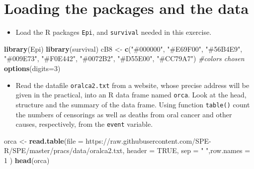 \documentclass[
]{book}
\newenvironment{Shaded}{\begin{snugshade}}{\end{snugshade}}
\newcommand{\AttributeTok}[1]{\textcolor[rgb]{0.13,0.29,0.53}{#1}}
\newcommand{\CommentTok}[1]{\textcolor[rgb]{0.56,0.35,0.01}{\textit{#1}}}
\newcommand{\ConstantTok}[1]{\textcolor[rgb]{0.56,0.35,0.01}{#1}}
\newcommand{\DecValTok}[1]{\textcolor[rgb]{0.00,0.00,0.81}{#1}}
\newcommand{\FunctionTok}[1]{\textcolor[rgb]{0.13,0.29,0.53}{\textbf{#1}}}
\newcommand{\NormalTok}[1]{#1}
\newcommand{\OtherTok}[1]{\textcolor[rgb]{0.56,0.35,0.01}{#1}}
\newcommand{\StringTok}[1]{\textcolor[rgb]{0.31,0.60,0.02}{#1}}
\providecommand{\tightlist}{%
  \setlength{\itemsep}{0pt}\setlength{\parskip}{0pt}}
\begin{document}
\section{Loading the packages and the data}\label{loading-the-packages-and-the-data}

\begin{itemize}
\tightlist
\item
  Load the R packages \texttt{Epi}, and \texttt{survival} needed in this exercise.
\end{itemize}

\begin{Shaded}
\begin{Highlighting}[]
\FunctionTok{library}\NormalTok{(Epi)}
\FunctionTok{library}\NormalTok{(survival)}
\NormalTok{cB8  }\OtherTok{\textless{}{-}} \FunctionTok{c}\NormalTok{(}\StringTok{"\#000000"}\NormalTok{, }\StringTok{"\#E69F00"}\NormalTok{, }\StringTok{"\#56B4E9"}\NormalTok{, }\StringTok{"\#009E73"}\NormalTok{, }
          \StringTok{"\#F0E442"}\NormalTok{, }\StringTok{"\#0072B2"}\NormalTok{, }\StringTok{"\#D55E00"}\NormalTok{, }\StringTok{"\#CC79A7"}\NormalTok{) }\CommentTok{\#colors chosen}
\FunctionTok{options}\NormalTok{(}\AttributeTok{digits=}\DecValTok{3}\NormalTok{)}
\end{Highlighting}
\end{Shaded}

\begin{itemize}
\tightlist
\item
  Read the datafile \texttt{oralca2.txt} from
  a website, whose precise address will be given in the practical,
  into an R data frame named \texttt{orca}.
  Look at the head, structure and the summary of the data frame.
  Using function \texttt{table()} count the numbers of censorings
  as well as deaths from oral cancer and other causes, respectively,
  from the \texttt{event} variable.
\end{itemize}

\begin{Shaded}
\begin{Highlighting}[]
\NormalTok{orca }\OtherTok{\textless{}{-}}  \FunctionTok{read.table}\NormalTok{(}\AttributeTok{file =} \StringTok{\textquotesingle{}https://raw.githubusercontent.com/SPE{-}R/SPE/master/pracs/data/oralca2.txt\textquotesingle{}}\NormalTok{, }\AttributeTok{header =} \ConstantTok{TRUE}\NormalTok{, }\AttributeTok{sep =} \StringTok{" "}\NormalTok{,}\AttributeTok{row.names =} \DecValTok{1}\NormalTok{ )}
\FunctionTok{head}\NormalTok{(orca)}
\end{Highlighting}
\end{Shaded}
\end{document}
